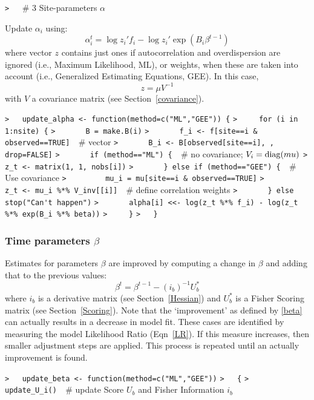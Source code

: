 \documentclass[a4paper]{article}
\begin{document}
\verb~>   ~{\sffamily\# 3 Site-parameters $\alpha$}\par
Update $\alpha_i$ using:
$$ \alpha_i^t = \log z_i' f_i - \log z_i' \exp(B_i \beta^{t-1}) $$
where vector $z$ contains just ones if autocorrelation and overdispersion are
ignored (i.e., Maximum Likelihood, ML),
or weights, when these are taken into account (i.e., Generalized Estimating
Equations, GEE).
In this case,
$$ z = \mu V^{-1} $$
with $V$ a covariance matrix (see Section~\ref{covariance}).\par
\verb~>   update_alpha <- function(method=c("ML","GEE")) {~\newline
\verb~>     for (i in 1:nsite) {~\newline
\verb~>       B = make.B(i)~\newline
\verb~>       f_i <- f[site==i & observed==TRUE]  ~{\sffamily\# vector}\newline
\verb~>       B_i <- B[observed[site==i], , drop=FALSE]~\newline
\verb~>       if (method=="ML") {  ~{\sffamily\# no covariance; $V_i = \operatorname{diag}(mu)$}\newline
\verb~>         z_t <- matrix(1, 1, nobs[i])~\newline
\verb~>       } else if (method=="GEE") {  ~{\sffamily\# Use covariance}\newline
\verb~>         mu_i = mu[site==i & observed==TRUE]~\newline
\verb~>         z_t <- mu_i %*% V_inv[[i]]  ~{\sffamily\# define correlation weights}\newline
\verb~>       } else stop("Can't happen")~\newline
\verb~>       alpha[i] <<- log(z_t %*% f_i) - log(z_t %*% exp(B_i %*% beta))~\newline
\verb~>     }~\newline
\verb~>   }~\par



\subsubsection{Time parameters $\beta$}\par

Estimates for parameters $\beta$ are improved by computing a change in $\beta$ and
adding that to the previous values:
$$ \beta^t = \beta^{t-1} - (i_b)^{-1} U_b^\ast \label{beta}$$
where $i_b$ is a derivative matrix (see Section~\ref{Hessian})
and $U_b^\ast$ is a Fisher Scoring matrix (see Section~\ref{Scoring}).
Note that the `improvement' as defined by \eqref{beta} can actually results in a decrease in model fit.
These cases are identified by measuring the model Likelihood Ratio (Eqn~\eqref{LR}).
If this measure increases, then smaller adjustment steps are applied.
This process is repeated until an actually improvement is found.\par
\verb~>   update_beta <- function(method=c("ML","GEE"))~\newline
\verb~>   {~\newline
\verb~>     update_U_i()  ~{\sffamily\# update Score $U_b$ and Fisher Information $i_b$}\par
\end{document}
